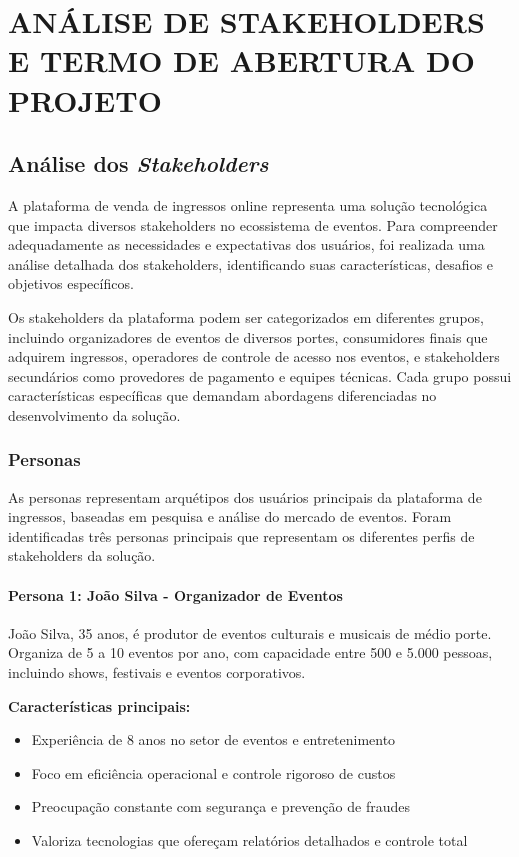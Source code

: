 \chapter{ANÁLISE DE STAKEHOLDERS E TERMO DE ABERTURA DO PROJETO}

\section{Análise dos \textit{Stakeholders}}

A plataforma de venda de ingressos online representa uma solução tecnológica que impacta diversos stakeholders no ecossistema de eventos. Para compreender adequadamente as necessidades e expectativas dos usuários, foi realizada uma análise detalhada dos stakeholders, identificando suas características, desafios e objetivos específicos.

Os stakeholders da plataforma podem ser categorizados em diferentes grupos, incluindo organizadores de eventos de diversos portes, consumidores finais que adquirem ingressos, operadores de controle de acesso nos eventos, e stakeholders secundários como provedores de pagamento e equipes técnicas. Cada grupo possui características específicas que demandam abordagens diferenciadas no desenvolvimento da solução.

\subsection{Personas}

As personas representam arquétipos dos usuários principais da plataforma de ingressos, baseadas em pesquisa e análise do mercado de eventos. Foram identificadas três personas principais que representam os diferentes perfis de stakeholders da solução.

\subsubsection{Persona 1: João Silva - Organizador de Eventos}

João Silva, 35 anos, é produtor de eventos culturais e musicais de médio porte. Organiza de 5 a 10 eventos por ano, com capacidade entre 500 e 5.000 pessoas, incluindo shows, festivais e eventos corporativos.

\textbf{Características principais:}
\begin{itemize}
    \item Experiência de 8 anos no setor de eventos e entretenimento
    \item Foco em eficiência operacional e controle rigoroso de custos
    \item Preocupação constante com segurança e prevenção de fraudes
    \item Valoriza tecnologias que ofereçam relatórios detalhados e controle total
\end{itemize}

